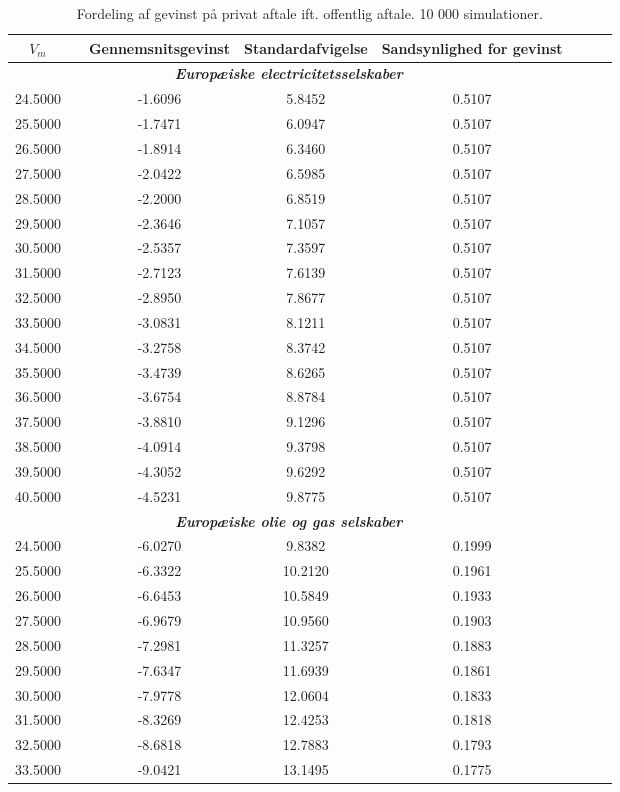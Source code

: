 \documentclass{article}
\begin{document}
\begin{table}[h]
	\caption{Fordeling af gevinst p\aa{} privat aftale ift. offentlig aftale. 10 000 simulationer.}
	\label{tab:rel_fordeling}
	\begin{tabularx}{\linewidth}{cXcccccr}
	\toprule[1pt]
	$V_m$ && Gennemsnitsgevinst & Standardafvigelse & Sandsynlighed for gevinst\\
	\hline
\multicolumn{5}{c}{\emph{\textbf{Europæiske electricitetsselskaber}}} \\ 
24.5000&&-1.6096& 5.8452& 0.5107\\
25.5000&&-1.7471& 6.0947& 0.5107\\
26.5000&&-1.8914& 6.3460& 0.5107\\
27.5000&&-2.0422& 6.5985& 0.5107\\
28.5000&&-2.2000& 6.8519& 0.5107\\
29.5000&&-2.3646& 7.1057& 0.5107\\
30.5000&&-2.5357& 7.3597& 0.5107\\
31.5000&&-2.7123& 7.6139& 0.5107\\
32.5000&&-2.8950& 7.8677& 0.5107\\
33.5000&&-3.0831& 8.1211& 0.5107\\
34.5000&&-3.2758& 8.3742& 0.5107\\
35.5000&&-3.4739& 8.6265& 0.5107\\
36.5000&&-3.6754& 8.8784& 0.5107\\
37.5000&&-3.8810& 9.1296& 0.5107\\
38.5000&&-4.0914& 9.3798& 0.5107\\
39.5000&&-4.3052& 9.6292& 0.5107\\
40.5000&&-4.5231& 9.8775& 0.5107\\
\multicolumn{5}{c}{\emph{\textbf{Europæiske olie og gas selskaber}}} \\
24.5000&&-6.0270& 9.8382& 0.1999\\
25.5000&&-6.3322&10.2120& 0.1961\\
26.5000&&-6.6453&10.5849& 0.1933\\
27.5000&&-6.9679&10.9560& 0.1903\\
28.5000&&-7.2981&11.3257& 0.1883\\
29.5000&&-7.6347&11.6939& 0.1861\\
30.5000&&-7.9778&12.0604& 0.1833\\
31.5000&&-8.3269&12.4253& 0.1818\\
32.5000&&-8.6818&12.7883& 0.1793\\
33.5000&&-9.0421&13.1495& 0.1775\\

\end{tabularx}
\end{table}
\end{document}
